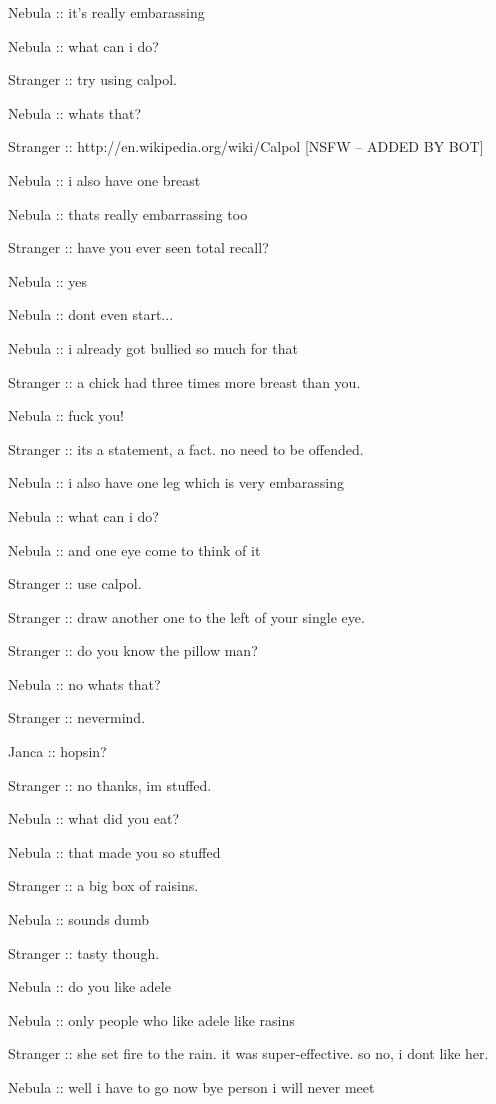 \documentclass[a1paper]{article}
\begin{document}
\begin{multicols}{7}
{Nebula :: it's really embarassing

Nebula :: what can i do?

Stranger :: try using calpol.

Nebula :: whats that?

Stranger :: http://en.wikipedia.org/wiki/Calpol [NSFW -- ADDED BY BOT]

Nebula :: i also have one breast

Nebula :: thats really embarrassing too

Stranger :: have you ever seen total recall?

Nebula :: yes

Nebula :: dont even start...

Nebula :: i already got bullied so much for that

Stranger :: a chick had three times more breast than you.

Nebula :: fuck you!

Stranger :: its a statement, a fact. no need to be offended.

Nebula :: i also have one leg which is very embarassing

Nebula :: what can i do?

Nebula :: and one eye come to think of it

Stranger :: use calpol.

Stranger :: draw another one to the left of your single eye.

Stranger :: do you know the pillow man?

Nebula :: no whats that?

Stranger :: nevermind.

Janca :: hopsin?

Stranger :: no thanks, im stuffed.

Nebula :: what did you eat?

Nebula :: that made you so stuffed

Stranger :: a big box of raisins.

Nebula :: sounds dumb

Stranger :: tasty though.

Nebula :: do you like adele

Nebula :: only people who like adele like rasins

Stranger :: she set fire to the rain. it was super-effective. so no, i dont like her.

Nebula :: well i have to go now bye person i will never meet

}
\end{multicols}
\end{document}
